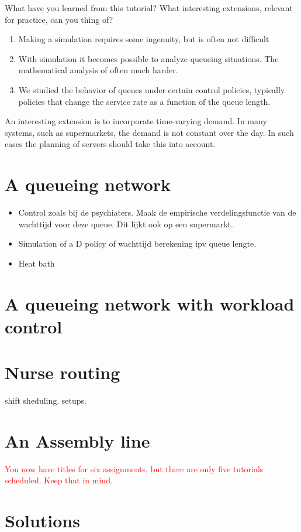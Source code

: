 \documentclass{scrartcl}
\newcommand{\notet}[1]{\textcolor{red}{#1}}
\begin{document}
\begin{exercise}
  What have you learned from this tutorial? What interesting extensions, relevant for practice,  can you thing of?
  \begin{solution}
    \begin{enumerate}
    \item  Making a  simulation requires some ingenuity, but is often not difficult
    \item With simulation it becomes possible to analyze queueing situations. The mathematical analysis of often much harder. 
    \item We studied the behavior of queues under certain control policies, typically policies that change the service rate as a function of the queue length.
    \end{enumerate}

An interesting extension is to incorporate time-varying demand. In many systems, such as supermarkets, the demand is not constant over the day. In such cases the planning of servers should take this into account. 

  \end{solution}
\end{exercise}

\clearpage



\section{A queueing network}
\label{sec:queueing-network}



\begin{itemize}
\item Control zoals bij de psychiaters. Maak de empirische verdelingsfunctie van de wachttijd voor deze queue. Dit lijkt ook op een supermarkt. 
\item Simulation of a D policy of wachttijd berekening ipv queue lengte.
\item Heat bath
\end{itemize}


\section{A queueing network with workload control}
\label{sec:queu-netw-with}




\section{Nurse routing}
\label{sec:nurse-routing}

shift sheduling. setups. 


\section{An Assembly line}
\label{sec:an-assembly-line}
\notet{You now have titles for six assignments, but there are only five tutorials scheduled. Keep that in mind.}





\clearpage
\section*{Solutions}

\end{document}

